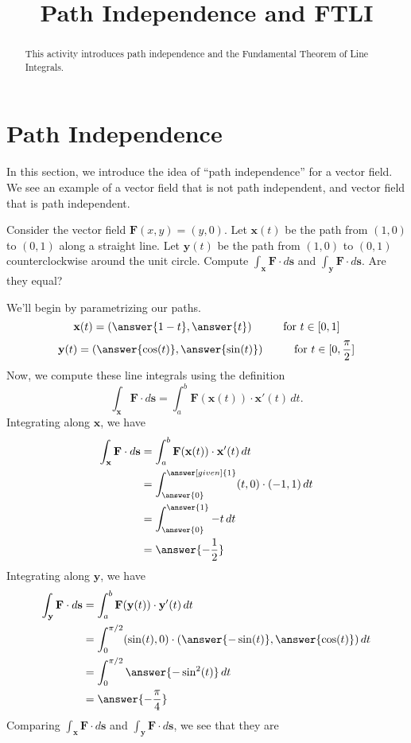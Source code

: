 \documentclass{ximera}
\title{Path Independence and FTLI}
\begin{document}
  
\begin{abstract}  
This activity introduces path independence and the Fundamental Theorem of Line Integrals.
\end{abstract}  
\maketitle  

\section{Path Independence}

In this section, we introduce the idea of ``path independence'' for a vector field. We see an example of a vector field that is not path independent, and vector field that is path independent.

\begin{example}
Consider the vector field $\textbf{F}(x,y) = (y,0)$. Let $\textbf{x}(t)$ be the path from $(1,0)$ to $(0,1)$ along a straight line. Let $\textbf{y}(t)$ be the path from $(1,0)$ to $(0,1)$ counterclockwise around the unit circle. Compute $\int_\textbf{x} \textbf{F}\cdot d\textbf{s}$ and $\int_\textbf{y} \textbf{F}\cdot d\textbf{s}$. Are they equal?
\begin{explanation}
We'll begin by parametrizing our paths.
\[
\textbf{x}(t)= (\answer{1-t},\answer{t})\hspace{1cm}\textrm{for }t\in[0,1]
\]
\[
\textbf{y}(t)= (\answer{\cos(t)},\answer{\sin(t)})\hspace{1cm}\textrm{for }t\in[0,\frac{\pi}{2}]
\]
Now, we compute these line integrals using the definition
\[
\int_\textbf{x} \textbf{F}\cdot d\textbf{s} = \int_a^b\textbf{F}(\textbf{x}(t))\cdot \textbf{x}'(t)\,dt.
\]
Integrating along $\textbf{x}$, we have
\begin{align*}
\int_\textbf{x} \textbf{F}\cdot d\textbf{s} &= \int_a^b\textbf{F}(\textbf{x}(t))\cdot \textbf{x}'(t)\,dt\\
&= \int_{\answer{0}}^{\answer[given]{1}}(t,0)\cdot(-1, 1)\,dt\\
&= \int_{\answer{0}}^{\answer{1}}-t\,dt\\
&= \answer{-\frac{1}{2}}
\end{align*}
Integrating along $\textbf{y}$, we have
\begin{align*}
\int_\textbf{y} \textbf{F}\cdot d\textbf{s} &= \int_a^b\textbf{F}(\textbf{y}(t))\cdot \textbf{y}'(t)\,dt\\
&= \int_{0}^{\pi/2}(\sin(t),0)\cdot({\answer{-\sin(t)}}, {\answer{\cos(t)}})\,dt\\
&= \int_{0}^{\pi/2}\answer{-\sin^2(t)}\,dt\\
&= \answer{-\frac{\pi}{4}}
\end{align*}
Comparing $\int_\textbf{x} \textbf{F}\cdot d\textbf{s}$ and $\int_\textbf{y} \textbf{F}\cdot d\textbf{s}$, we see that they are
\begin{multipleChoice}
\end{multipleChoice}
\end{explanation}
\end{example}
\end{document}
